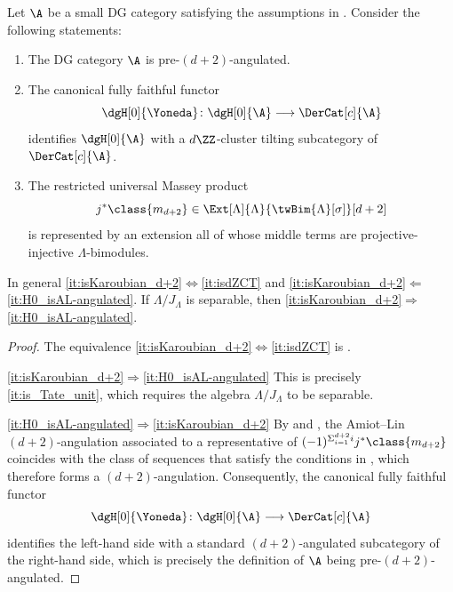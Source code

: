 \documentclass[a4paper]{amsart}
\begin{document}
\begin{corollary}
  \label{coro:pre-d+2-ang=unit}
  Let $\A$ be a small DG category satisfying the assumptions in
  . Consider the following statements:
  \begin{enumerate}
  \item\label{it:isKaroubian_d+2} The DG category $\A$ is pre-$(d+2)$-angulated.
  \item\label{it:isdZCT} The canonical fully faithful functor
    \[
      \dgH[0]{\Yoneda}\colon\dgH[0]{\A}\longrightarrow\DerCat[c]{\A}
    \]
    identifies $\dgH[0]{\A}$ with a $d\ZZ$-cluster tilting subcategory of
    $\DerCat[c]{\A}$.
  \item\label{it:H0_isAL-angulated} The restricted universal Massey product
    \[
      j^*\class{m_{d+2}}\in\Ext[\Lambda]{\Lambda}{\twBim{\Lambda}[\sigma]}[d+2]
    \]
    is represented by an extension all of whose middle terms are
    projective-injective $\Lambda$-bimodules.
  \end{enumerate}
  In general \eqref{it:isKaroubian_d+2}$\Leftrightarrow$\eqref{it:isdZCT} and
  \eqref{it:isKaroubian_d+2}$\Leftarrow$\eqref{it:H0_isAL-angulated}. If
  $\Lambda/J_\Lambda$ is separable, then
  \eqref{it:isKaroubian_d+2}$\Rightarrow$\eqref{it:H0_isAL-angulated}.
\end{corollary}
\begin{proof}
  The equivalence \eqref{it:isKaroubian_d+2}$\Leftrightarrow$\eqref{it:isdZCT}
  is .
  
  \eqref{it:isKaroubian_d+2}$\Rightarrow$\eqref{it:H0_isAL-angulated} This is
  precisely \eqref{it:is_Tate_unit}, which requires the
  algebra $\Lambda/J_\Lambda$ to be separable.

  \eqref{it:H0_isAL-angulated}$\Rightarrow$\eqref{it:isKaroubian_d+2} By
   and , the Amiot--Lin $(d+2)$-angulation associated to a representative of $(-1)^{\Sigma_{i=1}^{d+2}i}j^*\class{m_{d+2}}$ coincides with
  the class of sequences that satisfy the conditions in
  , which therefore forms a $(d+2)$-angulation.
  Consequently, the canonical fully faithful functor
  \[
    \dgH[0]{\Yoneda}\colon\dgH[0]{\A}\longrightarrow\DerCat[c]{\A}
  \]
  identifies the left-hand side with a standard $(d+2)$-angulated subcategory of
  the right-hand side, which is precisely the definition of $\A$ being
  pre-$(d+2)$-angulated.
\end{proof}
\end{document}
